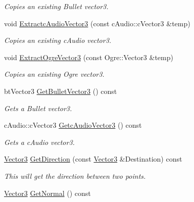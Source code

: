 \begin{DoxyCompactItemize}
\begin{DoxyCompactList}\small\item\em Copies an existing Bullet vector3. \item\end{DoxyCompactList}\item 
void \hyperlink{classphys_1_1Vector3_ab71c1de00db3a6ae36f4bb383c061e87}{ExtractcAudioVector3} (const cAudio::cVector3 \&temp)
\begin{DoxyCompactList}\small\item\em Copies an existing cAudio vector3. \item\end{DoxyCompactList}\item 
void \hyperlink{classphys_1_1Vector3_ac4a2cee593f8f64b1c4dde24a2511ad8}{ExtractOgreVector3} (const Ogre::Vector3 \&temp)
\begin{DoxyCompactList}\small\item\em Copies an existing Ogre vector3. \item\end{DoxyCompactList}\item 
btVector3 \hyperlink{classphys_1_1Vector3_adf4129007ee41f5a03e97502f2df9c41}{GetBulletVector3} () const 
\begin{DoxyCompactList}\small\item\em Gets a Bullet vector3. \item\end{DoxyCompactList}\item 
cAudio::cVector3 \hyperlink{classphys_1_1Vector3_a58b1ac39dfee4c360c16944a7e7f657d}{GetcAudioVector3} () const 
\begin{DoxyCompactList}\small\item\em Gets a cAudio vector3. \item\end{DoxyCompactList}\item 
\hyperlink{classphys_1_1Vector3}{Vector3} \hyperlink{classphys_1_1Vector3_a63cd464cdd9ba976ac112fdf8bb620be}{GetDirection} (const \hyperlink{classphys_1_1Vector3}{Vector3} \&Destination) const 
\begin{DoxyCompactList}\small\item\em This will get the direction between two points. \item\end{DoxyCompactList}\item 
\hyperlink{classphys_1_1Vector3}{Vector3} \hyperlink{classphys_1_1Vector3_a81e11f45378758391c97ec55b519951c}{GetNormal} () const 

\end{DoxyCompactItemize}
